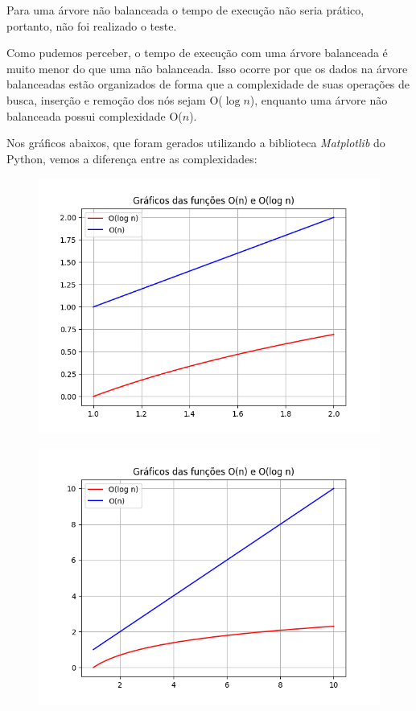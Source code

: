 \documentclass[12pt]{article}
\begin{document}
	Para uma árvore não balanceada o tempo de execução não seria prático, portanto, não foi realizado o teste.
	
	Como pudemos perceber, o tempo de execução com uma árvore balanceada é muito menor do que uma não balanceada. Isso ocorre por que os dados na árvore balanceadas estão organizados de forma que a complexidade de suas operações de busca, inserção e remoção dos nós sejam O($\log n$), enquanto uma árvore não balanceada possui complexidade O($n$).
	
	Nos gráficos abaixos, que foram gerados utilizando a biblioteca \textit{Matplotlib} do Python, vemos a diferença entre as complexidades:
	
	\begin{center}
		\begin{figure}[!h]
			\includegraphics[scale = 0.6]{1a2.png}
		\end{figure}
	\end{center}

	\begin{center}
		\begin{figure}[!h]
			\includegraphics[scale = 0.6]{1a10.png}
		\end{figure}
	\end{center}
	
\end{document}
